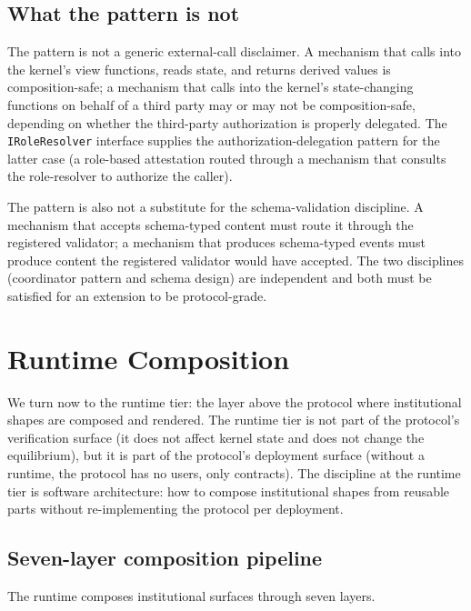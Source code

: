 \documentclass[11pt,a4paper]{article}
\theoremstyle{definition}
\theoremstyle{remark}
\begin{document}
\subsection{What the pattern is not}

The pattern is not a generic external-call disclaimer. A mechanism
that calls into the kernel's view functions, reads state, and
returns derived values is composition-safe; a mechanism that calls
into the kernel's state-changing functions on behalf of a third
party may or may not be composition-safe, depending on whether the
third-party authorization is properly delegated. The
\texttt{IRoleResolver} interface supplies the authorization-delegation
pattern for the latter case (a role-based attestation routed through
a mechanism that consults the role-resolver to authorize the
caller).

The pattern is also not a substitute for the schema-validation
discipline. A mechanism that accepts schema-typed content must
route it through the registered validator; a mechanism that produces
schema-typed events must produce content the registered validator
would have accepted. The two disciplines (coordinator pattern and
schema design) are independent and both must be satisfied for an
extension to be protocol-grade.

\section{Runtime Composition}
\label{sec:runtime}

We turn now to the runtime tier: the layer above the protocol where
institutional shapes are composed and rendered. The runtime tier is
not part of the protocol's verification surface (it does not affect
kernel state and does not change the equilibrium), but it is part of
the protocol's deployment surface (without a runtime, the protocol
has no users, only contracts). The discipline at the runtime tier is
software architecture: how to compose institutional shapes from
reusable parts without re-implementing the protocol per deployment.

\subsection{Seven-layer composition pipeline}

The runtime composes institutional surfaces through seven layers.
\end{document}
